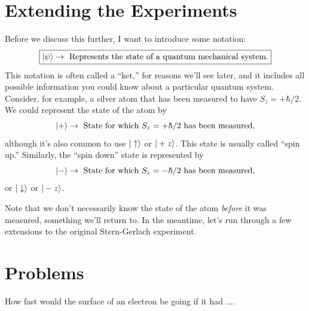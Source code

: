 %
%
%

\section{Extending the Experiments}

Before we discuss this further, I want to introduce some notation:
\begin{equation}
\label{eq_ket_definition}
\boxed{
| \psi \rangle \rightarrow \text{ Represents the state of a quantum mechanical system.}
}
\end{equation}
This notation is often called a ``ket,'' for reasons we'll see later, and it includes all possible information you could know about a particular quantum system.  Consider, for example, a silver atom that has been measured to have $S_z = +\hbar/2$.  We could represent the state of the atom by 
\[
| + \rangle \rightarrow \text{ State for which $S_z = +\hbar/2$ has been measured},
\]
although it's also common to use $| \uparrow \rangle$ or $| +z \rangle$.  This state is usually called ``spin up.''  Similarly, the ``spin down'' state is represented by 
\[
| - \rangle \rightarrow \text{ State for which $S_z = -\hbar/2$ has been measured},
\]
or  $| \downarrow \rangle$ or $| -z \rangle$.

Note that we don't necessarily know the state of the atom \emph{before} it was measured, something we'll return to.  In the meantime, let's run through a few extensions to the original Stern-Gerlach experiment.

%
%
%



\section*{Problems}
%

\begin{problem}
How fast would the surface of an electron be going if it had ....
\end{problem}

